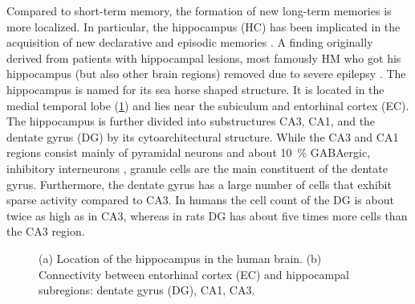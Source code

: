 Compared to short-term memory, the formation of new long-term memories is more localized.
In particular, the hippocampus (HC) has been implicated in the acquisition of new declarative and episodic memories \parencite{eichenbaum2001-1}.
A finding originally derived from patients with hippocampal lesions, most famously HM who got his hippocampus (but also other brain regions) removed due to severe epilepsy \parencite{penfield1958,scoville1957-1,squire2009}.
The hippocampus is named for its sea horse shaped structure.
It is located in the medial temporal lobe (\cref{fig:hc}) and lies near the subiculum and entorhinal cortex (EC).
The hippocampus is further divided into substructures CA3, CA1, and the dentate gyrus (DG) by its cytoarchitectural structure.
While the CA3 and CA1 regions consist mainly of pyramidal neurons and about \SI{10}{\percent} GABAergic, inhibitory interneurons \parencite{Freund1996}, granule cells are the main constituent of the dentate gyrus.
Furthermore, the dentate gyrus has a large number of cells that exhibit sparse activity compared to CA3.
In humans the cell count of the DG is about twice as high as in CA3, whereas in rats DG has about five times more cells than the CA3 region.
\begin{figure}
    \begin{addmargin*}[0mm]{-70.16pt}
        \hfill
        \hfill
        \hfill
        \caption[Hippocampal anatomy]{(a) Location of the hippocampus in the human brain. (b) Connectivity between entorhinal cortex (EC) and hippocampal subregions: dentate gyrus (DG), CA1, CA3.}\label{fig:hc}
    \end{addmargin*}
\end{figure}

